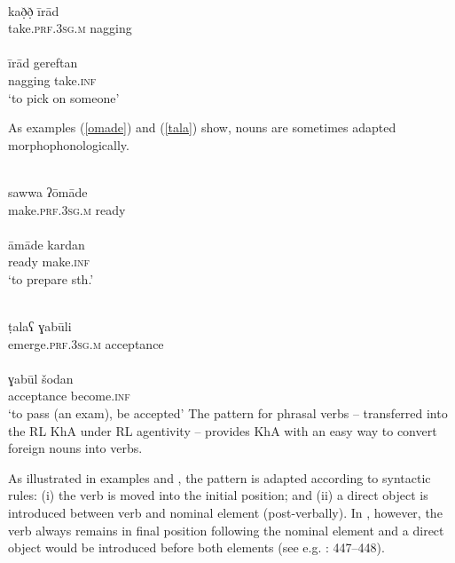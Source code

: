 \documentclass[output=paper,nonflat]{langsci/langscibook}
\begin{document}
\ea \label{irad}
\\
\gll kað̣ð̣ īrād\\
     take.\textsc{prf}.3\textsc{sg}.\textsc{m} nagging\\ 
\\
\gll īrād gereftan\\
     nagging take.\textsc{inf}\\
\glt ‘to pick on someone’ 
\z\z

 As examples (\ref{omade}) and (\ref{tala}) show,  nouns are sometimes adapted morphophonologically.

\ea \label{omade}
\\
\gll sawwa ʔōmāde\\
     make.\textsc{prf}.3\textsc{sg}.\textsc{m} ready\\ 
\\
\gll āmāde kardan \\
     ready make.\textsc{inf}\\
\glt ‘to prepare sth.’
\z\z

\ea \label{tala}
\\
\gll ṭalaʕ ɣabūli\footnotemark \\
     emerge.\textsc{prf}.3\textsc{sg}.\textsc{m} acceptance\\
\\
\gll ɣabūl šodan\\
     acceptance become.\textsc{inf} \\
\glt ‘to pass (an exam), be accepted’
\z\z
{}
The pattern for phrasal verbs – transferred into the {RL} KhA under {RL} agentivity – provides KhA with an easy way to convert foreign nouns into verbs.

As illustrated in examples  and , the pattern is adapted according to  syntactic rules: (i) the verb is moved into the initial position; and (ii) a direct object is introduced between verb and nominal element (post-verbally). In , however, the verb always remains in final position following the nominal element and a direct object would be introduced before both elements (see e.g. \citealt{Majidi1990}: 447–448).
\end{document}
